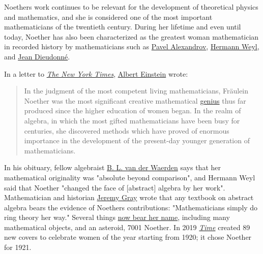 Noether\textquotesingle s work continues to be relevant for the development of theoretical physics and mathematics, and she is considered one of the most important mathematicians of the twentieth century. During her lifetime and even until today, Noether has also been characterized as the greatest woman mathematician in recorded history by mathematicians such as \href{https://en.wikipedia.org/wiki/Pavel_Alexandrov}{Pavel Alexandrov}, \href{https://en.wikipedia.org/wiki/Hermann_Weyl}{Hermann Weyl}, and \href{https://en.wikipedia.org/wiki/Jean_Dieudonné}{Jean Dieudonné}.

In a letter to \emph{\href{https://en.wikipedia.org/wiki/The_New_York_Times}{The New York Times}}, \href{https://en.wikipedia.org/wiki/Albert_Einstein}{Albert Einstein} wrote:

\begin{quote}
In the judgment of the most competent living mathematicians, Fräulein Noether was the most significant creative mathematical \href{https://en.wikipedia.org/wiki/Genius}{genius} thus far produced since the higher education of women began. In the realm of algebra, in which the most gifted mathematicians have been busy for centuries, she discovered methods which have proved of enormous importance in the development of the present-day younger generation of mathematicians.
\end{quote}

In his obituary, fellow algebraist \href{https://en.wikipedia.org/wiki/B._L._van_der_Waerden}{B. L. van der Waerden} says that her mathematical originality was "absolute beyond comparison", and Hermann Weyl said that Noether "changed the face of {[}abstract{]} algebra by her work". Mathematician and historian \href{https://en.wikipedia.org/wiki/Jeremy_Gray_(mathematician)}{Jeremy Gray} wrote that any textbook on abstract algebra bears the evidence of Noether\textquotesingle s contributions: "Mathematicians simply do ring theory her way." Several things \href{https://en.wikipedia.org/wiki/List_of_things_named_after_Emmy_Noether}{now bear her name}, including many mathematical objects, and an asteroid, 7001 Noether. In 2019 \emph{\href{https://en.wikipedia.org/wiki/Time_(magazine)}{Time}} created 89 new covers to celebrate women of the year starting from 1920; it chose Noether for 1921.






